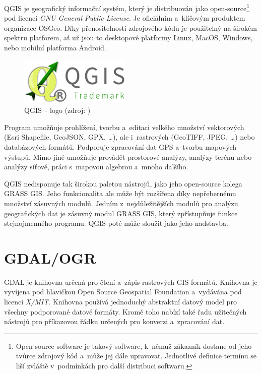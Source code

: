 \documentclass[a4paper,12pt,oneside]{book}
\begin{document}
QGIS je geografický informační systém, který je distribuován jako open-source\footnote{Open-source software je takový software, k~němuž zákazník dostane od jeho tvůrce zdrojový kód a~může jej dále upravovat. Jednotlivé definice termínu  se liší zvláště v~podmínkách pro další distribuci softwaru.\cite{abclinuxu_opensource}} pod licencí \textit{GNU General Public License}. Je oficiálním a~klíčovým produktem organizace OSGeo. Díky přenositelnosti zdrojového kódu je použitelný na širokém spektru platforem, ať už jsou to desktopové platformy Linux, MacOS, Windows, nebo mobilní platforma Android.

\begin{figure}[htb]
\centering
\includegraphics[scale=1]{images/qgis-logo.png}
\caption[QGIS -- logo]{QGIS -- logo (zdroj: \cite{qgis})}
\end{figure}

Program umožňuje prohlížení, tvorbu a~editaci velkého množství vektorových (Esri Shapefile, GeoJSON, GPX, \dots), ale i~rastrových (GeoTIFF, JPEG, \dots) nebo databázových formátů. Podporuje zpracování dat GPS a~tvorbu mapových výstupů. Mimo jiné umožňuje provádět prostorové analýzy, analýzy terénu nebo analýzy síťové, práci s~mapovou algebrou a~mnoho dalšího.

QGIS nedisponuje tak širokou paletou nástrojů, jako jeho open-source kolega GRASS GIS. Jeho funkcionalita ale může být rozšířena díky nepřebernému množství zásuvných modulů. Jedním z~nejdůležitějších modulů pro analýzu geografických dat je zásuvný modul GRASS GIS, který zpřístupňuje funkce stejnojmenného programu. QGIS poté může sloužit jako jeho nadstavba.
\cite{qgis}
\cite{qgis_wiki}


\section{GDAL/OGR}

GDAL je knihovna určená pro čtení a~zápis rastrových GIS formátů. Knihovna je vyvíjena pod hlavičkou Open Source Geospatial Foundation a~vydávána pod licencí \textit{X/MIT}. Knihovna používá jednoduchý abstraktní datový model pro všechny podporované datové formáty. Kromě toho nabízí také řadu užitečných nástrojů pro příkazovou řádku určených pro konverzi a~zpracování dat. \cite{gdal_wiki}
\end{document}
